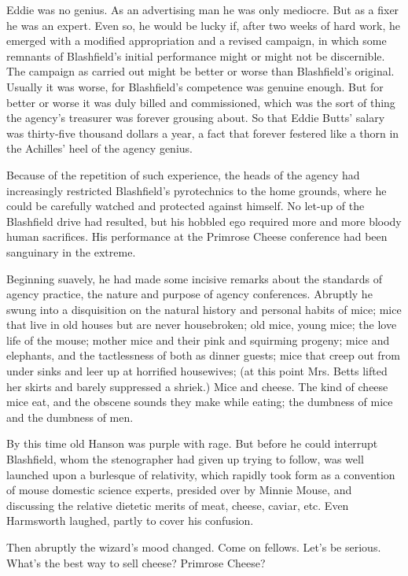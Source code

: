 \documentclass[nohyper,openany,nobib]{tufte-book}
\begin{document}
Eddie was no genius. As an advertising man he was only mediocre. But as
a fixer he was an expert. Even so, he would be lucky if, after two weeks
of hard work, he emerged with a modified appropriation and a revised
campaign, in which some remnants of Blashfield's initial performance
might or might not be discernible. The campaign as carried out might be
better or worse than Blashfield's original. Usually it was worse, for
Blashfield's competence was genuine enough. But for better or worse it
was duly billed and commissioned, which was the sort of thing the
agency's treasurer was forever grousing about. So that Eddie Butts'
salary was thirty-five thousand dollars a year, a fact that forever
festered like a thorn in the Achilles' heel of the agency genius.

Because of the repetition of such experience, the heads of the agency
had increasingly restricted Blashfield's pyrotechnics to the home
grounds, where he could be carefully watched and protected against
himself. No let-up of the Blashfield drive had resulted, but his hobbled
ego required more and more bloody human sacrifices. His performance at
the Primrose Cheese conference had been sanguinary in the extreme.

Beginning suavely, he had made some incisive remarks about the standards
of agency practice, the nature and purpose of agency conferences.
Abruptly he swung into a disquisition on the natural history and
personal habits of mice; mice that live in old houses but are never
housebroken; old mice, young mice; the love life of the mouse; mother
mice and their pink and squirming progeny; mice and elephants, and the
tactlessness of both as dinner guests; mice that creep out from under
sinks and leer up at horrified housewives; (at this point Mrs. Betts
lifted her skirts and barely suppressed a shriek.) Mice and cheese. The
kind of cheese mice eat, and the obscene sounds they make while eating;
the dumbness of mice and the dumbness of men.

By this time old Hanson was purple with rage. But before he could
interrupt Blashfield, whom the stenographer had given up trying to
follow, was well launched upon a burlesque of relativity, which rapidly
took form as a convention of mouse domestic science experts, presided
over by Minnie Mouse, and discussing the relative dietetic merits of
meat, cheese, caviar, etc. Even Harmsworth laughed, partly to cover his
confusion.

Then abruptly the wizard's mood changed. Come on fellows. Let's be
serious. What's the best way to sell cheese? Primrose Cheese?
\end{document}
